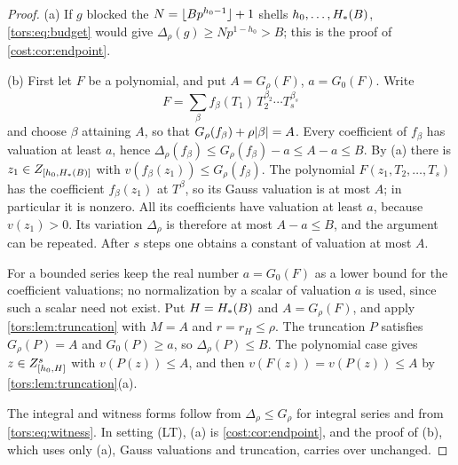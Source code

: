 \begin{proof}
(a) If $g$ blocked the $N=\lfloor Bp^{h_0-1}\rfloor+1$ shells $h_0,\dots,H_{*}(B)$,
\eqref{tors:eq:budget} would give $\Delta_\rho(g)\ge Np^{1-h_0}>B$; this is the proof of
\cref{cost:cor:endpoint}.

(b) First let $F$ be a polynomial, and put $A=G_\rho(F)$, $a=G_0(F)$. Write
\[
  F=\sum_\beta f_\beta(T_1)\,T_2^{\beta_2}\cdots T_s^{\beta_s}
\]
and choose $\beta$ attaining $A$, so that $G_\rho(f_\beta)+\rho\lvert\beta\rvert=A$. Every
coefficient of $f_\beta$ has valuation at least $a$, hence
$\Delta_\rho(f_\beta)\le G_\rho(f_\beta)-a\le A-a\le B$. By (a) there is
$z_1\in Z_{[h_0,H_{*}(B)]}$ with $v(f_\beta(z_1))\le G_\rho(f_\beta)$. The polynomial
$F(z_1,T_2,\dots,T_s)$ has the coefficient $f_\beta(z_1)$ at $T^\beta$, so its Gauss
valuation is at most $A$; in particular it is nonzero. All its coefficients have
valuation at least $a$, because $v(z_1)>0$. Its variation $\Delta_\rho$ is therefore at
most $A-a\le B$, and the argument can be repeated. After $s$ steps one obtains a constant
of valuation at most $A$.

For a bounded series keep the real number $a=G_0(F)$ as a lower bound for the coefficient
valuations; no normalization by a scalar of valuation $a$ is used, since such a scalar
need not exist. Put $H=H_{*}(B)$ and $A=G_\rho(F)$, and apply
\cref{tors:lem:truncation} with $M=A$ and $r=r_H\le\rho$. The truncation $P$ satisfies
$G_\rho(P)=A$ and $G_0(P)\ge a$, so $\Delta_\rho(P)\le B$. The polynomial case gives
$z\in Z_{[h_0,H]}^s$ with $v(P(z))\le A$, and then $v(F(z))=v(P(z))\le A$ by
\cref{tors:lem:truncation}(a).

The integral and witness forms follow from $\Delta_\rho\le G_\rho$ for integral series and
from \eqref{tors:eq:witness}. In setting \textup{(LT)}, (a) is \cref{cost:cor:endpoint},
and the proof of (b), which uses only (a), Gauss valuations and truncation, carries over
unchanged.
\end{proof}

